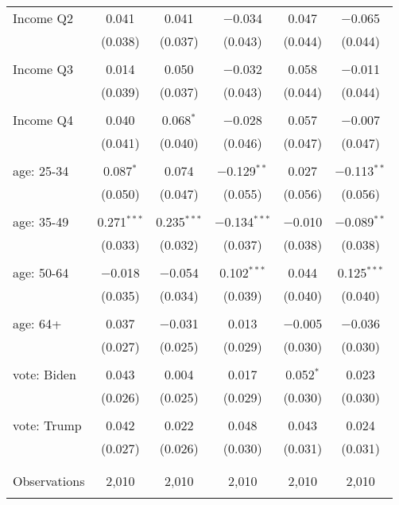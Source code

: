 \begin{tabular}{@{\extracolsep{5pt}}lccccc}
 Income Q2 & 0.041 & 0.041 & $-$0.034 & 0.047 & $-$0.065 \\ 
  & (0.038) & (0.037) & (0.043) & (0.044) & (0.044) \\ 
  & & & & & \\ 
 Income Q3 & 0.014 & 0.050 & $-$0.032 & 0.058 & $-$0.011 \\ 
  & (0.039) & (0.037) & (0.043) & (0.044) & (0.044) \\ 
  & & & & & \\ 
 Income Q4 & 0.040 & 0.068$^{*}$ & $-$0.028 & 0.057 & $-$0.007 \\ 
  & (0.041) & (0.040) & (0.046) & (0.047) & (0.047) \\ 
  & & & & & \\ 
 age: 25-34 & 0.087$^{*}$ & 0.074 & $-$0.129$^{**}$ & 0.027 & $-$0.113$^{**}$ \\ 
  & (0.050) & (0.047) & (0.055) & (0.056) & (0.056) \\ 
  & & & & & \\ 
 age: 35-49 & 0.271$^{***}$ & 0.235$^{***}$ & $-$0.134$^{***}$ & $-$0.010 & $-$0.089$^{**}$ \\ 
  & (0.033) & (0.032) & (0.037) & (0.038) & (0.038) \\ 
  & & & & & \\ 
 age: 50-64 & $-$0.018 & $-$0.054 & 0.102$^{***}$ & 0.044 & 0.125$^{***}$ \\ 
  & (0.035) & (0.034) & (0.039) & (0.040) & (0.040) \\ 
  & & & & & \\ 
 age: 64+ & 0.037 & $-$0.031 & 0.013 & $-$0.005 & $-$0.036 \\ 
  & (0.027) & (0.025) & (0.029) & (0.030) & (0.030) \\ 
  & & & & & \\ 
 vote: Biden & 0.043 & 0.004 & 0.017 & 0.052$^{*}$ & 0.023 \\ 
  & (0.026) & (0.025) & (0.029) & (0.030) & (0.030) \\ 
  & & & & & \\ 
 vote: Trump & 0.042 & 0.022 & 0.048 & 0.043 & 0.024 \\ 
  & (0.027) & (0.026) & (0.030) & (0.031) & (0.031) \\ 
  & & & & & \\ 
\hline \\[-1.8ex] 

Observations & 2,010 & 2,010 & 2,010 & 2,010 & 2,010 \\ 
\hline 
\hline \\[-1.8ex] 
\end{tabular} 